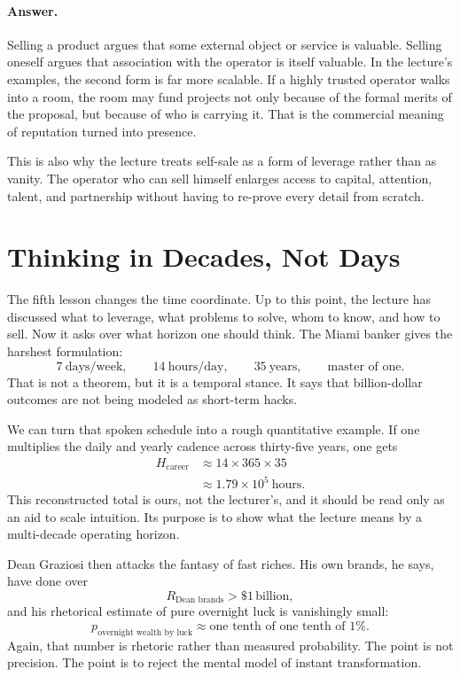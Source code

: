 \paragraph{Answer.} Selling a product argues that some external object or service is valuable. Selling oneself argues that association with the operator is itself valuable. In the lecture's examples, the second form is far more scalable. If a highly trusted operator walks into a room, the room may fund projects not only because of the formal merits of the proposal, but because of who is carrying it. That is the commercial meaning of reputation turned into presence.

This is also why the lecture treats self-sale as a form of leverage rather than as vanity. The operator who can sell himself enlarges access to capital, attention, talent, and partnership without having to re-prove every detail from scratch.

\section{Thinking in Decades, Not Days}

The fifth lesson changes the time coordinate. Up to this point, the lecture has discussed what to leverage, what problems to solve, whom to know, and how to sell. Now it asks over what horizon one should think. The Miami banker gives the harshest formulation:
\begin{equation}
7\ \text{days/week},
\qquad
14\ \text{hours/day},
\qquad
35\ \text{years},
\qquad
\text{master of one}.
\end{equation}
That is not a theorem, but it is a temporal stance. It says that billion-dollar outcomes are not being modeled as short-term hacks.

We can turn that spoken schedule into a rough quantitative example. If one multiplies the daily and yearly cadence across thirty-five years, one gets
\begin{align}
H_{\text{career}}
&\approx 14 \times 365 \times 35 \\
&\approx 1.79\times 10^5\ \text{hours}.
\end{align}
This reconstructed total is ours, not the lecturer's, and it should be read only as an aid to scale intuition. Its purpose is to show what the lecture means by a multi-decade operating horizon.

Dean Graziosi then attacks the fantasy of fast riches. His own brands, he says, have done over
\begin{equation}
R_{\text{Dean brands}} > \$1\,\text{billion},
\end{equation}
and his rhetorical estimate of pure overnight luck is vanishingly small:
\begin{equation}
p_{\text{overnight wealth by luck}} \approx \text{one tenth of one tenth of }1\%.
\end{equation}
Again, that number is rhetoric rather than measured probability. The point is not precision. The point is to reject the mental model of instant transformation.

